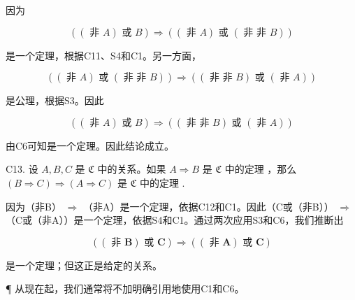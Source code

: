 因为

\[
((\text { 非 } A) \text { 或 } B) \Longrightarrow ((\text { 非 } A) \text { 或 } (\text { 非   非 } B))
\]

是一个定理，根据C11、S4和C1。另一方面，

\[
((\text { 非 } A) \text { 或 } (\text { 非   非 } B)) \Longrightarrow ((\text { 非   非 } B) \text { 或 } (\text { 非 } A))
\]

是公理，根据S3。因此

\[
((\text { 非 } A) \text { 或 } B) \Longrightarrow ((\text { 非   非 } B) \text { 或 } (\text { 非 } A))
\]

由C6可知是一个定理。因此结论成立。

C13. 设 \(A, B, C\) 是 \(\mathfrak{C}\) 中的关系。如果 \(A \Rightarrow B\) 是 \(\mathfrak{C}\) 中的定理 ，那么 \((B \Rightarrow C) \Rightarrow (A \Rightarrow C)\) 是 \(\mathfrak{C}\) 中的定理 .

因为（非B） \(\Longrightarrow\) （非A）是一个定理，依据C12和C1。因此（C或（非B）） \(\Longrightarrow\) （C或（非A））是一个定理，依据S4和C1。通过两次应用S3和C6，我们推断出

\[
((\text { 非 } \boldsymbol {B}) \text { 或 } \boldsymbol {C}) \Longrightarrow ((\text { 非 } \boldsymbol {A}) \text { 或 } \boldsymbol {C})
\]

是一个定理；但这正是给定的关系。

¶ 从现在起，我们通常将不加明确引用地使用C1和C6。

